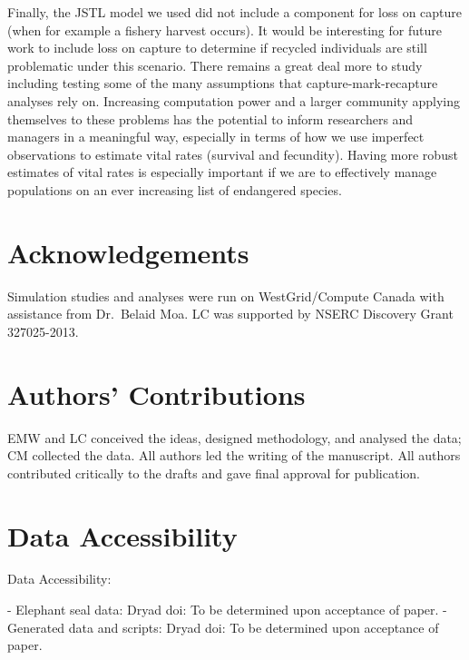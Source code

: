 \documentclass[12pt]{article}
\begin{document}
Finally, the JSTL model we used did not include a component for loss on capture (when for example a fishery harvest occurs).  It would be interesting for future work to include loss on capture to determine if recycled individuals are still problematic under this scenario.  There remains a great deal more to study including testing some of the many assumptions that capture-mark-recapture analyses rely on.  Increasing computation power and a larger community applying themselves to these problems has the potential to inform researchers and managers in a meaningful way, especially in terms of how we use imperfect observations to estimate vital rates (survival and fecundity). Having more robust estimates of vital rates is especially important if we are to effectively manage populations on an ever increasing list of endangered species.


\section{Acknowledgements}\label{acknowledgements}
Simulation studies and analyses were run on WestGrid/Compute Canada with
assistance from Dr.~Belaid Moa. LC was supported by NSERC Discovery Grant 327025-2013.


\section{Authors' Contributions}
EMW and LC conceived the ideas, designed methodology, and analysed the data; CM collected the data. All authors led the writing of the manuscript.  All authors contributed critically to the drafts and gave final approval for publication.

\section{Data Accessibility}
Data Accessibility:

- Elephant seal data: Dryad doi: To be determined upon acceptance of paper.
- Generated data and scripts: Dryad doi: To be determined upon acceptance of paper.







\bigskip




\end{document}
